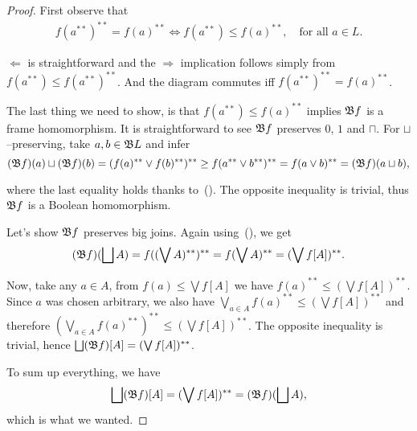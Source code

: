 \begin{proof}
    First observe that
    \begin{align}
        f(a^{**})^{**} = f(a)^{**} \iff f(a^{**}) \leq f(a)^{**},\quad\text{for all } a\in L.\label{e:2202iff20leq02}\tag{W.O.}
    \end{align}

    $\Leftarrow$ is straightforward and the $\Rightarrow$ implication follows simply from $f(a^{**}) \leq f(a^{**})^{**} $. And the diagram commutes iff $f(a^{**})^{**} = f(a)^{**}$.

    The last thing we need to show, is that $f(a^{**}) \leq f(a)^{**}$ implies $\mathfrak{B} f$ is a frame homomorphism. It is straightforward to see $\mathfrak{B} f$ preserves $0$, $1$ and $\sqcap$. For $\sqcup$--preserving, take $a, b \in \mathfrak{B} L$ and infer
    $$(\mathfrak{B} f)(a)\sqcup (\mathfrak{B} f)(b) = (f(a)^{**}\vee f(b)^{**})^{**} \geq f(a^{**}\vee b^{**})^{**} = f(a\vee b)^{**} = (\mathfrak{B} f)(a\sqcup b),$$

    \noindent where the last equality holds thanks to~(). The opposite inequality is trivial, thus $\mathfrak{B} f$ is a Boolean homomorphism.

    Let's show $\mathfrak{B} f$ preserves big joins. Again using~(), we get
    $$ (\mathfrak{B} f)(\bigsqcup A) = f((\bigvee A)^{**})^{**} = f(\bigvee A)^{**} = (\bigvee f[A])^{**}. $$

    Now, take any $a\in A$, from $f(a) \leq \bigvee f[A]$ we have $f(a)^{**} \leq (\bigvee f[A])^{**}$. Since $a$ was chosen arbitrary, we also have $\bigvee_{a\in A} f(a)^{**} \leq (\bigvee f[A])^{**}$ and therefore $(\bigvee_{a\in A} f(a)^{**})^{**} \leq (\bigvee f[A])^{**}$. The opposite inequality is trivial, hence $\bigsqcup (\mathfrak{B} f)[A] = (\bigvee f[A])^{**}$.

    To sum up everything, we have
    $$ \bigsqcup (\mathfrak{B} f)[A] = (\bigvee f[A])^{**} = (\mathfrak{B} f)(\bigsqcup A),$$
    \noindent which is what we wanted.
\end{proof}

